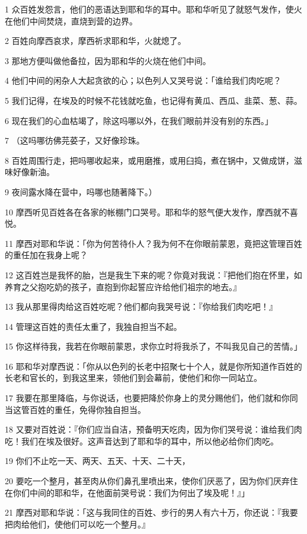 \par 1 众百姓发怨言，他们的恶语达到耶和华的耳中。耶和华听见了就怒气发作，使火在他们中间焚烧，直烧到营的边界。
\par 2 百姓向摩西哀求，摩西祈求耶和华，火就熄了。
\par 3 那地方便叫做他备拉，因为耶和华的火烧在他们中间。
\par 4 他们中间的闲杂人大起贪欲的心；以色列人又哭号说：「谁给我们肉吃呢？
\par 5 我们记得，在埃及的时候不花钱就吃鱼，也记得有黄瓜、西瓜、韭菜、葱、蒜。
\par 6 现在我们的心血枯竭了，除这吗哪以外，在我们眼前并没有别的东西。」
\par 7 （这吗哪彷佛芫荽子，又好像珍珠。
\par 8 百姓周围行走，把吗哪收起来，或用磨推，或用臼捣，煮在锅中，又做成饼，滋味好像新油。
\par 9 夜间露水降在营中，吗哪也随著降下。）
\par 10 摩西听见百姓各在各家的帐棚门口哭号。耶和华的怒气便大发作，摩西就不喜悦。
\par 11 摩西对耶和华说：「你为何苦待仆人？我为何不在你眼前蒙恩，竟把这管理百姓的重任加在我身上呢？
\par 12 这百姓岂是我怀的胎，岂是我生下来的呢？你竟对我说：『把他们抱在怀里，如养育之父抱吃奶的孩子，直抱到你起誓应许给他们祖宗的地去。』
\par 13 我从那里得肉给这百姓吃呢？他们都向我哭号说：『你给我们肉吃吧！』
\par 14 管理这百姓的责任太重了，我独自担当不起。
\par 15 你这样待我，我若在你眼前蒙恩，求你立时将我杀了，不叫我见自己的苦情。」
\par 16 耶和华对摩西说：「你从以色列的长老中招聚七十个人，就是你所知道作百姓的长老和官长的，到我这里来，领他们到会幕前，使他们和你一同站立。
\par 17 我要在那里降临，与你说话，也要把降於你身上的灵分赐他们，他们就和你同当这管百姓的重任，免得你独自担当。
\par 18 又要对百姓说：『你们应当自洁，预备明天吃肉，因为你们哭号说：谁给我们肉吃！我们在埃及很好。这声音达到了耶和华的耳中，所以他必给你们肉吃。
\par 19 你们不止吃一天、两天、五天、十天、二十天，
\par 20 要吃一个整月，甚至肉从你们鼻孔里喷出来，使你们厌恶了，因为你们厌弃住在你们中间的耶和华，在他面前哭号说：我们为何出了埃及呢！』」
\par 21 摩西对耶和华说：「这与我同住的百姓、步行的男人有六十万，你还说：『我要把肉给他们，使他们可以吃一个整月。』
